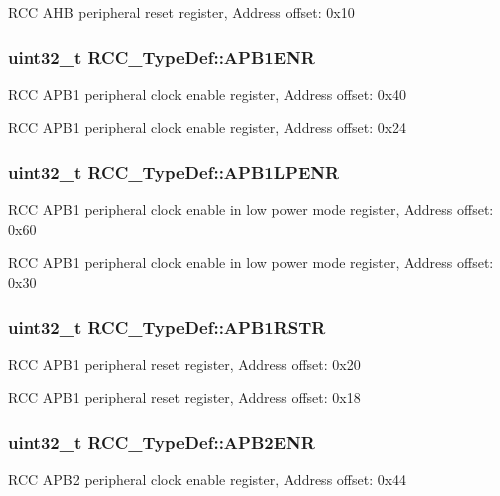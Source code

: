 R\-C\-C A\-H\-B peripheral reset register, Address offset\-: 0x10 \hypertarget{struct_r_c_c___type_def_aec7622ba90341c9faf843d9ee54a759f}{
\subsubsection[{A\-P\-B1\-E\-N\-R}]{ uint32\-\_\-t R\-C\-C\-\_\-\-Type\-Def\-::\-A\-P\-B1\-E\-N\-R}}\label{struct_r_c_c___type_def_aec7622ba90341c9faf843d9ee54a759f}
R\-C\-C A\-P\-B1 peripheral clock enable register, Address offset\-: 0x40

R\-C\-C A\-P\-B1 peripheral clock enable register, Address offset\-: 0x24 \hypertarget{struct_r_c_c___type_def_a5c8e710c40b642dcbf296201a7ecb2da}{
\subsubsection[{A\-P\-B1\-L\-P\-E\-N\-R}]{ uint32\-\_\-t R\-C\-C\-\_\-\-Type\-Def\-::\-A\-P\-B1\-L\-P\-E\-N\-R}}\label{struct_r_c_c___type_def_a5c8e710c40b642dcbf296201a7ecb2da}
R\-C\-C A\-P\-B1 peripheral clock enable in low power mode register, Address offset\-: 0x60

R\-C\-C A\-P\-B1 peripheral clock enable in low power mode register, Address offset\-: 0x30 \hypertarget{struct_r_c_c___type_def_a600f4d6d592f43edb2fc653c5cba023a}{
\subsubsection[{A\-P\-B1\-R\-S\-T\-R}]{ uint32\-\_\-t R\-C\-C\-\_\-\-Type\-Def\-::\-A\-P\-B1\-R\-S\-T\-R}}\label{struct_r_c_c___type_def_a600f4d6d592f43edb2fc653c5cba023a}
R\-C\-C A\-P\-B1 peripheral reset register, Address offset\-: 0x20

R\-C\-C A\-P\-B1 peripheral reset register, Address offset\-: 0x18 \hypertarget{struct_r_c_c___type_def_a619b4c22f630a269dfd0c331f90f6868}{
\subsubsection[{A\-P\-B2\-E\-N\-R}]{ uint32\-\_\-t R\-C\-C\-\_\-\-Type\-Def\-::\-A\-P\-B2\-E\-N\-R}}\label{struct_r_c_c___type_def_a619b4c22f630a269dfd0c331f90f6868}
R\-C\-C A\-P\-B2 peripheral clock enable register, Address offset\-: 0x44

